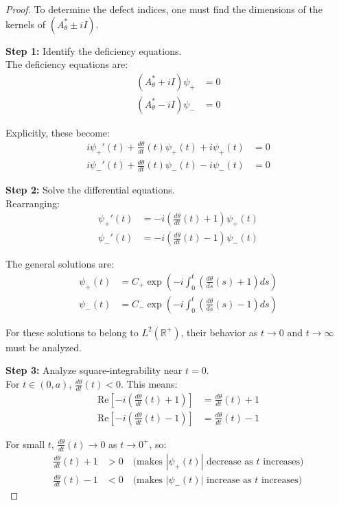 \documentclass{article}
\theoremstyle{definition}
\begin{document}
\begin{proof}
To determine the defect indices, one must find the dimensions of the kernels of $(A_{\theta}^* \pm iI)$.

\textbf{Step 1:} Identify the deficiency equations.\\
The deficiency equations are:
\begin{align}
(A_{\theta}^* + iI)\psi_+ &= 0\\
(A_{\theta}^* - iI)\psi_- &= 0
\end{align}

Explicitly, these become:
\begin{align}
i\psi_+'(t) + \frac{d\theta}{dt}(t)\psi_+(t) + i\psi_+(t) &= 0\\
i\psi_-'(t) + \frac{d\theta}{dt}(t)\psi_-(t) - i\psi_-(t) &= 0
\end{align}

\textbf{Step 2:} Solve the differential equations.\\
Rearranging:
\begin{align}
\psi_+'(t) &= -i\left(\frac{d\theta}{dt}(t) + 1\right)\psi_+(t)\\
\psi_-'(t) &= -i\left(\frac{d\theta}{dt}(t) - 1\right)\psi_-(t)
\end{align}

The general solutions are:
\begin{align}
\psi_+(t) &= C_+ \exp\left(-i\int_0^t \left(\frac{d\theta}{ds}(s) + 1\right)ds\right)\\
\psi_-(t) &= C_- \exp\left(-i\int_0^t \left(\frac{d\theta}{ds}(s) - 1\right)ds\right)
\end{align}

For these solutions to belong to $L^2(\mathbb{R}^+)$, their behavior as $t \rightarrow 0$ and $t \rightarrow \infty$ must be analyzed.

\textbf{Step 3:} Analyze square-integrability near $t=0$.\\
For $t \in (0,a)$, $\frac{d\theta}{dt}(t) < 0$. This means:
\begin{align}
\text{Re}\left[-i\left(\frac{d\theta}{dt}(t) + 1\right)\right] &= \frac{d\theta}{dt}(t) + 1\\
\text{Re}\left[-i\left(\frac{d\theta}{dt}(t) - 1\right)\right] &= \frac{d\theta}{dt}(t) - 1
\end{align}

For small $t$, $\frac{d\theta}{dt}(t) \to 0$ as $t \to 0^+$, so:
\begin{align}
\frac{d\theta}{dt}(t) + 1 &> 0 \quad \text{(makes $|\psi_+(t)|$ decrease as $t$ increases)}\\
\frac{d\theta}{dt}(t) - 1 &< 0 \quad \text{(makes $|\psi_-(t)|$ increase as $t$ increases)}
\end{align}


\end{proof}
\end{document}
